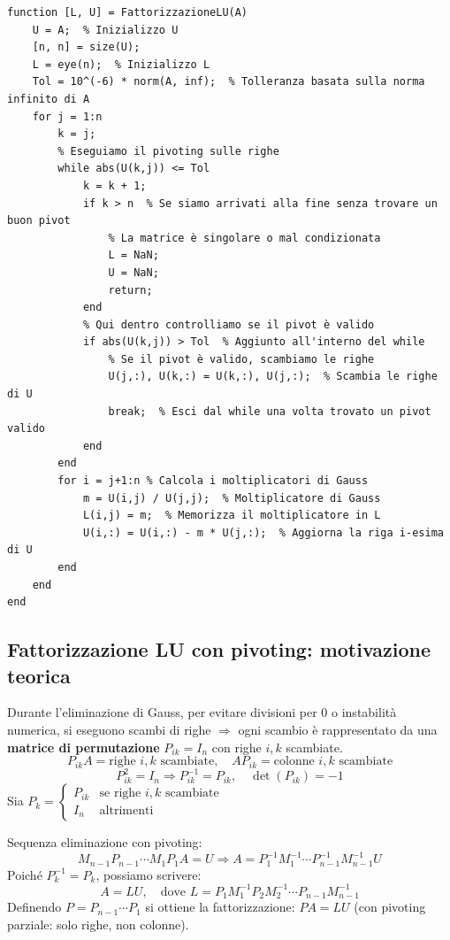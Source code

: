 \documentclass[12pt,a4paper]{article}
\begin{document}
\begin{lstlisting}
function [L, U] = FattorizzazioneLU(A)
    U = A;  % Inizializzo U
    [n, n] = size(U);
    L = eye(n);  % Inizializzo L
    Tol = 10^(-6) * norm(A, inf);  % Tolleranza basata sulla norma infinito di A
    for j = 1:n
        k = j;
        % Eseguiamo il pivoting sulle righe
        while abs(U(k,j)) <= Tol
            k = k + 1;
            if k > n  % Se siamo arrivati alla fine senza trovare un buon pivot
                % La matrice è singolare o mal condizionata
                L = NaN;
                U = NaN;
                return;
            end
            % Qui dentro controlliamo se il pivot è valido
            if abs(U(k,j)) > Tol  % Aggiunto all'interno del while
                % Se il pivot è valido, scambiamo le righe
                U(j,:), U(k,:) = U(k,:), U(j,:);  % Scambia le righe di U
                break;  % Esci dal while una volta trovato un pivot valido
            end
        end
        for i = j+1:n % Calcola i moltiplicatori di Gauss
            m = U(i,j) / U(j,j);  % Moltiplicatore di Gauss
            L(i,j) = m;  % Memorizza il moltiplicatore in L
            U(i,:) = U(i,:) - m * U(j,:);  % Aggiorna la riga i-esima di U
        end
    end
end

\end{lstlisting}
\newpage
\subsection*{Fattorizzazione LU con pivoting: motivazione teorica}

Durante l’eliminazione di Gauss, per evitare divisioni per 0 o instabilità numerica, si eseguono scambi di righe $\Rightarrow$ ogni scambio è rappresentato da una \textbf{matrice di permutazione} $P_{ik} = I_n$ con righe $i,k$ scambiate.\\
\[
P_{ik}A = \text{righe $i,k$ scambiate},\quad AP_{ik} = \text{colonne $i,k$ scambiate}
\]
\[
P_{ik}^2 = I_n \Rightarrow P_{ik}^{-1} = P_{ik}, \quad \det(P_{ik}) = -1
\]
Sia $P_k = \begin{cases} P_{ik} & \text{se righe } i,k \text{ scambiate} \\ I_n & \text{altrimenti} \end{cases}$

Sequenza eliminazione con pivoting:
\[
M_{n-1}P_{n-1} \cdots M_1P_1 A = U \Rightarrow A = P_1^{-1}M_1^{-1} \cdots P_{n-1}^{-1}M_{n-1}^{-1}U
\]
Poiché $P_k^{-1} = P_k$, possiamo scrivere:
\[
A = LU,\quad \text{dove } L = P_1M_1^{-1}P_2M_2^{-1} \cdots P_{n-1}M_{n-1}^{-1}
\]
Definendo $P = P_{n-1} \cdots P_1$ si ottiene la fattorizzazione:
$PA = LU$
(con pivoting parziale: solo righe, non colonne).
\end{document}
